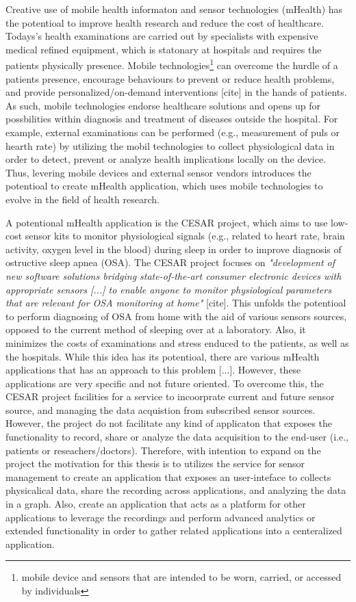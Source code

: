 Creative use of mobile health informaton and sensor technologies (mHealth) has the potentioal to improve health research and reduce the cost of healthcare. Todays's health examinations are carried out by specialists with expensive medical refined equipment, which is statonary at hospitals and requires the patients physically presence.  Mobile technologies\footnote{mobile device and sensors that are intended to be worn, carried, or accessed by individuals} can overcome the hurdle of a patients presence, encourage behaviours to prevent or reduce health problems, and provide personalized/on-demand interventions [cite] in the hands of patients. As such, mobile technologies endorse healthcare solutions and opens up for possbilities within diagnosis and treatment of diseases outside the hospital. For example, external examinations can be performed (e.g., measurement of puls or hearth rate) by utilizing the mobil technologies to collect physiological data in order to detect, prevent or analyze health implications locally on the device. Thus, levering mobile devices and external sensor vendors introduces the potentioal to create mHealth application, which uses mobile technologies to evolve in the field of health research.   

A potentional mHealth application is the CESAR project, which aims to use low-cost sensor kits to monitor physiological signals (e.g., related to heart rate, brain activity, oxygen level in the blood) during sleep in order to improve diagnosis of ostructive sleep apnea (OSA). The CESAR project focuses on \textit{"development of new software solutions bridging state-of-the-art consumer electronic devices with appropriate sensors [...] to enable anyone to monitor physiological parameters that are relevant for OSA monitoring at home"} [cite]. This unfolds the potentioal to perform diagnosing of OSA from home with the aid of various sensors sources, opposed to the current method of sleeping over at a laboratory. Also, it minimizes the costs of examinations and stress enduced to the patients, as well as the hospitals. While this idea has its  potentioal, there are various mHealth applications that has an approach to this problem [...]. However, these applications are very specific and not future oriented. To overcome this, the CESAR project facilities for a service to incoorprate current and future sensor source, and managing the data acquistion from subscribed sensor sources. However, the project do not facilitate any kind of applicaton that exposes the functionality to record, share or analyze the data acquisition to the end-user (i.e., patients or reseachers/doctors). Therefore, with intention to expand on the project the motivation for this thesis is to utilizes the service for sensor management to create an application that exposes an user-inteface to collects physicalical data, share the recording across applications, and analyzing the data in a graph. Also, create an application that acts as a platform for other applications to leverage the recordings and perform advanced analytics or extended functionality in order to gather related applications into a centeralized application.

